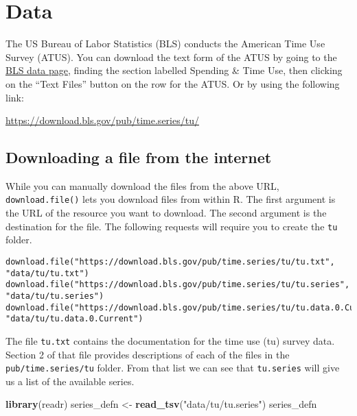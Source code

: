 \documentclass[]{book}
\newenvironment{Shaded}{\begin{snugshade}}{\end{snugshade}}
\newcommand{\KeywordTok}[1]{\textcolor[rgb]{0.13,0.29,0.53}{\textbf{{#1}}}}
\newcommand{\StringTok}[1]{\textcolor[rgb]{0.31,0.60,0.02}{{#1}}}
\newcommand{\NormalTok}[1]{{#1}}
\theoremstyle{definition}
\theoremstyle{definition}
\theoremstyle{remark}
\begin{document}
\section{Data}\label{data-5}

The US Bureau of Labor Statistics (BLS) conducts the American Time Use
Survey (ATUS). You can download the text form of the ATUS by going to
the \href{https://www.bls.gov/data/}{BLS data page}, finding the section
labelled Spending \& Time Use, then clicking on the ``Text Files''
button on the row for the ATUS. Or by using the following link:

\url{https://download.bls.gov/pub/time.series/tu/}

\subsection{Downloading a file from the
internet}\label{downloading-a-file-from-the-internet}

While you can manually download the files from the above URL,
\texttt{download.file()} lets you download files from within R. The
first argument is the URL of the resource you want to download. The
second argument is the destination for the file. The following requests
will require you to create the \texttt{tu} folder.

\begin{verbatim}
download.file("https://download.bls.gov/pub/time.series/tu/tu.txt", "data/tu/tu.txt")
download.file("https://download.bls.gov/pub/time.series/tu/tu.series", "data/tu/tu.series")
download.file("https://download.bls.gov/pub/time.series/tu/tu.data.0.Current", "data/tu/tu.data.0.Current")
\end{verbatim}

The file \texttt{tu.txt} contains the documentation for the time use
(tu) survey data. Section 2 of that file provides descriptions of each
of the files in the \texttt{pub/time.series/tu} folder. From that list
we can see that \texttt{tu.series} will give us a list of the available
series.

\begin{Shaded}
\begin{Highlighting}[]
\KeywordTok{library}\NormalTok{(readr)}
\NormalTok{series_defn <-}\StringTok{ }\KeywordTok{read_tsv}\NormalTok{(}\StringTok{"data/tu/tu.series"}\NormalTok{)}
\NormalTok{series_defn}
\end{Highlighting}
\end{Shaded}
\end{document}
